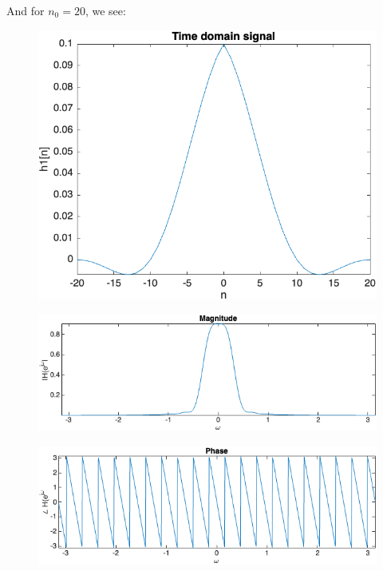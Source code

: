 \documentclass[12pt]{article}
\begin{document}
\begin{enumerate}[label=\textbf{\alph*)}, leftmargin=2.6em]
\begin{figure} [H]
\end{figure}
And for $n_0=20$, we see:
\begin{figure} [H]
    \centering
    \includegraphics[width=0.75\linewidth]{13.png}
\end{figure}
\begin{figure} [H]
    \centering
    \includegraphics[width=0.75\linewidth]{14.png}
\end{figure}
\begin{figure} [H]
    \centering
    \includegraphics[width=0.75\linewidth]{15.png}
\end{figure}


\end{enumerate}
\end{document}
